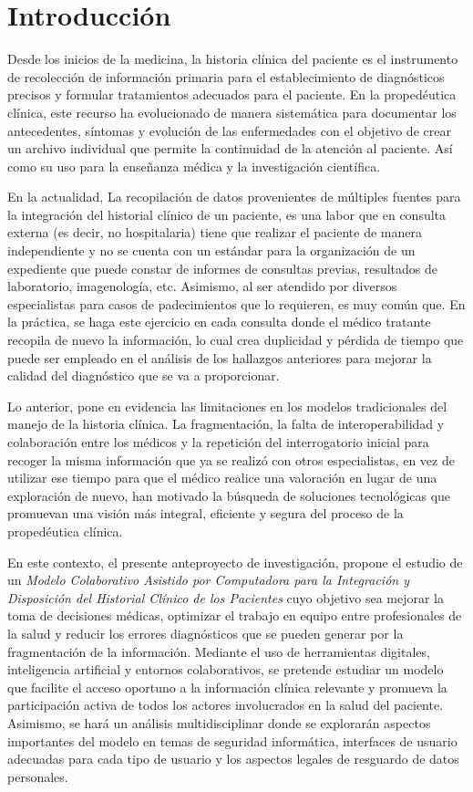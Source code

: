 \setlength{\parskip}{1em} %
\setlength{\parindent}{0pt} %
\section{Introducción}
Desde los inicios de la medicina, la historia clínica del paciente es el instrumento de recolección de información primaria para el establecimiento de diagnósticos precisos y formular tratamientos adecuados para el paciente. En la propedéutica clínica, este recurso ha evolucionado de manera sistemática para documentar los antecedentes, síntomas y evolución de las enfermedades con el objetivo de crear un archivo individual que permite la continuidad de la atención al paciente. Así como su uso para la enseñanza médica y la investigación científica. 

En la actualidad, La recopilación de datos provenientes de múltiples fuentes para la integración del historial clínico de un paciente, es una labor que en consulta externa (es decir, no hospitalaria) tiene que realizar el paciente de manera independiente y no se cuenta con un estándar para la organización de un expediente que puede constar de informes de consultas previas, resultados de laboratorio, imagenología, etc. Asimismo, al ser atendido por diversos especialistas para casos de padecimientos que lo requieren, es muy común que. En la práctica, se haga este ejercicio en cada consulta donde el médico tratante recopila de nuevo la información, lo cual crea duplicidad y pérdida de tiempo que puede ser empleado en el análisis de los hallazgos anteriores para mejorar la calidad del diagnóstico que se va a proporcionar. 

Lo anterior, pone en evidencia las limitaciones en los modelos tradicionales del manejo de la historia clínica. La fragmentación, la falta de interoperabilidad y colaboración entre los médicos y la repetición del interrogatorio inicial para recoger la misma información que ya se realizó con otros especialistas, en vez de utilizar ese tiempo para que el médico realice una valoración en lugar de una exploración de nuevo, han motivado la búsqueda de soluciones tecnológicas que promuevan una visión más integral, eficiente y segura del proceso de la propedéutica clínica.

En este contexto, el presente anteproyecto de investigación, propone el estudio de un \textit{Modelo Colaborativo Asistido por Computadora para la Integración y Disposición del Historial Clínico de los Pacientes} cuyo objetivo sea mejorar la toma de decisiones médicas, optimizar el trabajo en equipo entre profesionales de la salud y reducir los errores diagnósticos que se pueden generar por la fragmentación de la información. Mediante el uso de herramientas digitales, inteligencia artificial y entornos colaborativos, se pretende estudiar un modelo que facilite el acceso oportuno a la información clínica relevante y promueva la participación activa de todos los actores involucrados en la salud del paciente. Asimismo, se hará un análisis multidisciplinar donde se explorarán aspectos importantes del modelo en temas de seguridad informática, interfaces de usuario adecuadas para cada tipo de usuario y los aspectos legales de resguardo de datos personales.
